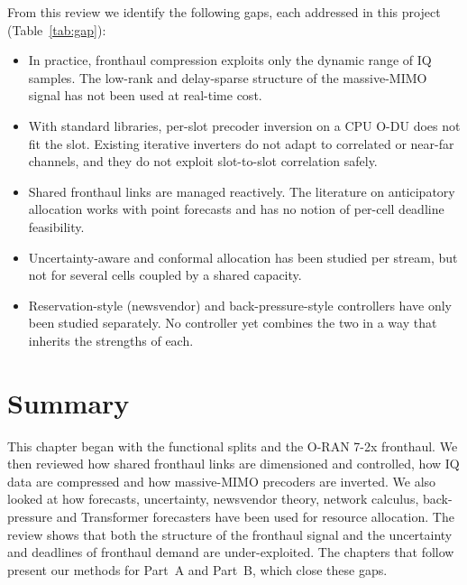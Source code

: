 From this review we identify the following gaps, each addressed in this project (Table~\ref{tab:gap}):
\begin{itemize}
  \item In practice, fronthaul compression exploits only the dynamic range of IQ samples. The low-rank and delay-sparse structure of the massive-MIMO signal has not been used at real-time cost.
  \item With standard libraries, per-slot precoder inversion on a CPU O-DU does not fit the slot. Existing iterative inverters do not adapt to correlated or near-far channels, and they do not exploit slot-to-slot correlation safely.
  \item Shared fronthaul links are managed reactively. The literature on anticipatory allocation works with point forecasts and has no notion of per-cell deadline feasibility.
  \item Uncertainty-aware and conformal allocation has been studied per stream, but not for several cells coupled by a shared capacity.
  \item Reservation-style (newsvendor) and back-pressure-style controllers have only been studied separately. No controller yet combines the two in a way that inherits the strengths of each.
\end{itemize}

\section{Summary}

This chapter began with the functional splits and the O-RAN 7-2x fronthaul. We then reviewed how shared fronthaul links are dimensioned and controlled, how IQ data are compressed and how massive-MIMO precoders are inverted. We also looked at how forecasts, uncertainty, newsvendor theory, network calculus, back-pressure and Transformer forecasters have been used for resource allocation. The review shows that both the structure of the fronthaul signal and the uncertainty and deadlines of fronthaul demand are under-exploited. The chapters that follow present our methods for Part~A and Part~B, which close these gaps.
